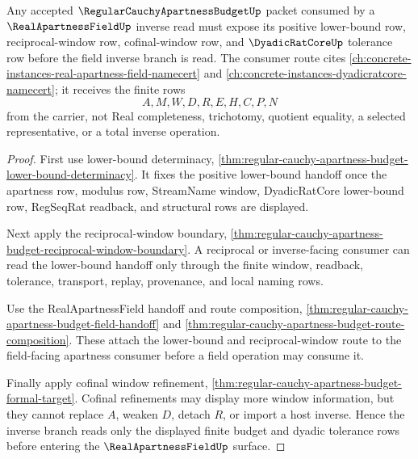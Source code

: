 \begin{theorem}
\label{thm:regular-cauchy-apartness-budget-inverse-window-consumption}
Any accepted $\RegularCauchyApartnessBudgetUp$ packet consumed by a $\RealApartnessFieldUp$ inverse read must expose its positive lower-bound row, reciprocal-window row, cofinal-window row, and $\DyadicRatCoreUp$ tolerance row before the field inverse branch is read. The consumer route cites \autoref{ch:concrete-instances-real-apartness-field-namecert} and \autoref{ch:concrete-instances-dyadicratcore-namecert}; it receives the finite rows
$$
A,M,W,D,R,E,H,C,P,N
$$
from the carrier, not Real completeness, trichotomy, quotient equality, a selected representative, or a total inverse operation.
\end{theorem}
\begin{proof}
First use lower-bound determinacy, \autoref{thm:regular-cauchy-apartness-budget-lower-bound-determinacy}. It fixes the positive lower-bound handoff once the apartness row, modulus row, StreamName window, DyadicRatCore lower-bound row, RegSeqRat readback, and structural rows are displayed.

Next apply the reciprocal-window boundary, \autoref{thm:regular-cauchy-apartness-budget-reciprocal-window-boundary}. A reciprocal or inverse-facing consumer can read the lower-bound handoff only through the finite window, readback, tolerance, transport, replay, provenance, and local naming rows.

Use the RealApartnessField handoff and route composition, \autoref{thm:regular-cauchy-apartness-budget-field-handoff} and \autoref{thm:regular-cauchy-apartness-budget-route-composition}. These attach the lower-bound and reciprocal-window route to the field-facing apartness consumer before a field operation may consume it.

Finally apply cofinal window refinement, \autoref{thm:regular-cauchy-apartness-budget-formal-target}. Cofinal refinements may display more window information, but they cannot replace $A$, weaken $D$, detach $R$, or import a host inverse. Hence the inverse branch reads only the displayed finite budget and dyadic tolerance rows before entering the $\RealApartnessFieldUp$ surface.
\end{proof}

